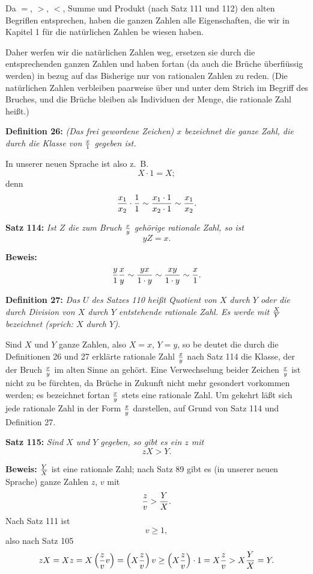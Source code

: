 
Da $=$, $>$, $<$, Summe und Produkt (nach Satz 111 und 112)
den alten Begriflen entsprechen, haben die ganzen Zahlen alle
Eigenschaften, die wir in Kapitel 1 f\"ur die nat\"urlichen Zahlen be%
wiesen haben.

Daher werfen wir die nat\"urlichen Zahlen weg, ersetzen sie
durch die entsprechenden ganzen Zahlen und haben fortan (da auch
die Br\"uche \"uberfi\"ussig werden) in bezug auf das Bisherige nur von
rationalen Zahlen zu reden.  (Die nat\"urlichen Zahlen verbleiben
paarweise \"uber und unter dem Strich im Begriff des Bruches, und
die Br\"uche bleiben als Individuen der Menge, die rationale Zahl
hei{\ss}t.)
\medskip


{\bf Definition 26:} {\it {\rm (Das frei gewordene Zeichen)} $x$ bezeichnet die ganze
Zahl, die durch die Klasse von $x \over 1$ gegeben ist.}

In unserer neuen Sprache ist also z.~B.
$$X \cdot 1 = X;$$
denn
$${x_1 \over x_2} \cdot {1 \over 1} \sim {x_1 \cdot 1 \over x_2 \cdot 1} \sim {x_1 \over x_2}.$$
\medskip


{\bf Satz 114:} {\it Ist $Z$ die zum Bruch $x \over y$ geh\"orige rationale Zahl, so ist
$$yZ = x.$$}%

{\bf Beweis:} $${y \over 1}{x \over y} \sim {yx \over 1 \cdot y} \sim {xy \over 1 \cdot y} \sim {x \over 1}.$$
\medskip


{\bf Definition 27:} {\it Das $U$ des Satzes 110 hei{\ss}t Quotient von $X$
durch $Y$ oder die durch Division von $X$ durch $Y$ entstehende rationale
Zahl.  Es werde mit $X \over Y$ bezeichnet {\rm (sprich: $X$ durch $Y$).}}

Sind $X$ und $Y$ ganze Zahlen, also $X = x$, $Y = y$, so be%
deutet die durch die Definitionen 26 und 27 erkl\"arte rationale Zahl
$x \over y$ nach Satz 114 die Klasse, der der Bruch $x \over y$ im alten Sinne an%
geh\"ort.  Eine Verwechselung beider Zeichen $x \over y$ ist nicht zu be%
f\"urchten, da Br\"uche in Zukunft nicht mehr gesondert vorkommen
werden; es bezeichnet fortan $x \over y$ stets eine rationale Zahl. Um%
gekehrt l\"a{\ss}t sich jede rationale Zahl in der Form $x \over y$ darstellen,
auf Grund von Satz 114 und Definition 27.
\medskip


{\bf Satz 115:} {\it Sind $X$ und $Y$ gegeben, so gibt es ein $z$ mit
$$zX > Y.$$}%

{\bf Beweis:} $Y \over X$ ist eine rationale Zahl; nach Satz 89 gibt es (in
unserer neuen Sprache) ganze Zahlen $z$, $v$ mit
$${z \over v} > {Y \over X}.$$
Nach Satz 111 ist
$$v \ge 1,$$
also nach Satz 105
$$zX = Xz = X\left({z \over v}v\right) = \left(X{z \over v}\right)v \ge \left(X{z \over v}\right) \cdot 1 = X{z \over v} > X{Y \over X} = Y.$$
\vfill\eject


